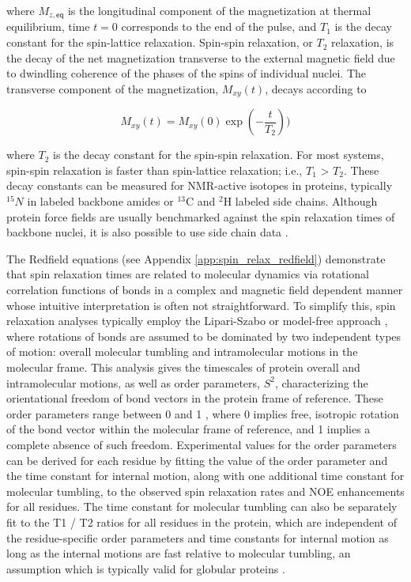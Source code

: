 \documentclass[9pt,review]{livecoms}
\begin{document}
\noindent where $M_{z,\mathsf{eq}}$ is the longitudinal component of the magnetization at thermal equilibrium, time $t = 0$ corresponds to the end of the pulse, and $T_1$ is the decay constant for the spin-lattice relaxation.
Spin-spin relaxation, or $T_2$ relaxation, is the decay of the net magnetization transverse to the external magnetic field due to dwindling coherence of the phases of the spins of individual nuclei. The transverse component of the magnetization, $M_{xy}(t)$, decays according to

\begin{equation}
\label{eqn:t2_relax}
M_{xy}(t) = M_{xy}(0) \exp(-\frac {t} {T_2}))
\end{equation}

\noindent where $T_2$ is the decay constant for the spin-spin relaxation.
For most systems, spin-spin relaxation is faster than spin-lattice relaxation; i.e., $T_1$ > $T_2$.
These decay constants can be measured for NMR-active isotopes in proteins, typically $^{15}N$ in labeled backbone amides or $^{13}$C and $^2$H labeled side chains.
Although protein force fields are usually benchmarked against the spin relaxation times of backbone nuclei, it is also possible to use side chain data \cite{hoffmann_accurate_2018}.

The Redfield equations \cite{redfield_theory_1965} (see Appendix \ref{app:spin_relax_redfield}) demonstrate that spin relaxation times are related to molecular dynamics via rotational correlation functions of bonds in a complex and magnetic field dependent manner whose intuitive interpretation is often not straightforward.
To simplify this,  spin relaxation analyses \cite{best_determination_2004,showalter_toward_2007,showalter_validation_2007,maragakis_microsecond_2008,trbovic_structural_2008}typically employ the Lipari-Szabo or model-free approach \cite{lipari_model-free_1982}, where rotations of bonds are assumed to be dominated by two independent types of motion: overall molecular tumbling and intramolecular motions in the molecular frame.
This analysis gives the timescales of protein overall and intramolecular motions, as well as order parameters, $S^2$, characterizing the orientational freedom of bond vectors in the protein frame of reference.
These order parameters range between 0 and 1 \cite{lipari_model-free_1982}, where 0 implies free, isotropic rotation of the bond vector within the molecular frame of reference, and 1 implies a complete absence of such freedom.
Experimental values for the order parameters can be derived for each residue by fitting the value of the order parameter and the time constant for internal motion, along with one additional time constant for molecular tumbling, to the observed spin relaxation rates and NOE enhancements for all residues.
The time constant for molecular tumbling can also be separately fit to the T1 / T2 ratios for all residues in the protein, which are independent of the residue-specific order parameters and time constants for internal motion as long as the internal motions are fast relative to molecular tumbling, an assumption which is typically valid for globular proteins \cite{virtanen_heterogeneous_2020}.
\end{document}
